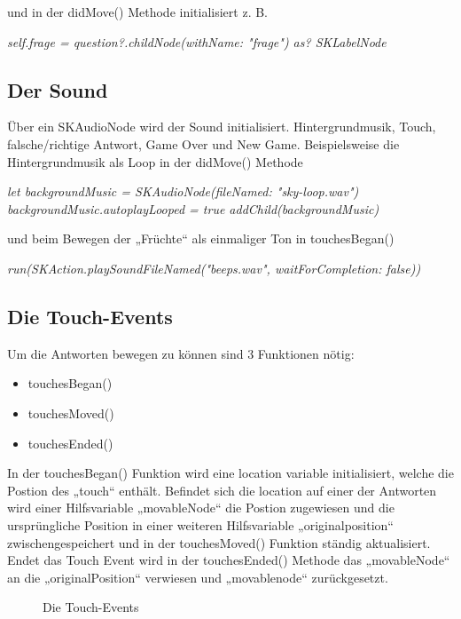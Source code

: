 und in der didMove() Methode initialisiert z. B.

		\textit{self.frage = question?.childNode(withName: "frage") as? SKLabelNode}

\subsection{Der Sound}
Über ein SKAudioNode wird der Sound initialisiert. Hintergrundmusik, Touch, falsche/richtige Antwort, Game Over und New Game.
Beispielsweise die Hintergrundmusik als Loop in der didMove() Methode

\textit{let backgroundMusic = SKAudioNode(fileNamed: "sky-loop.wav")
        backgroundMusic.autoplayLooped = true
        addChild(backgroundMusic)}

und beim Bewegen der „Früchte“ als einmaliger Ton in touchesBegan()

\textit{run(SKAction.playSoundFileNamed("beeps.wav", waitForCompletion: false))}

\subsection{Die Touch-Events}
Um die Antworten bewegen zu können sind 3 Funktionen nötig:

\begin{itemize}
\item touchesBegan()
\item touchesMoved()
\item touchesEnded()
\end{itemize}

In der touchesBegan() Funktion wird eine location variable initialisiert, welche die Postion des „touch“ enthält. 
Befindet sich die location auf einer der Antworten wird einer Hilfsvariable „movableNode“ die Postion zugewiesen und die ursprüngliche Position in einer weiteren Hilfsvariable „originalposition“ zwischengespeichert und in der touchesMoved() Funktion ständig aktualisiert. 
Endet das Touch Event wird in der touchesEnded() Methode das „movableNode“ an die „originalPosition“ verwiesen und „movablenode“ zurückgesetzt.

\begin{figure}[H]
	\centering
	\caption{Die Touch-Events}
	\label{Die Touch-Events}
\end{figure}




